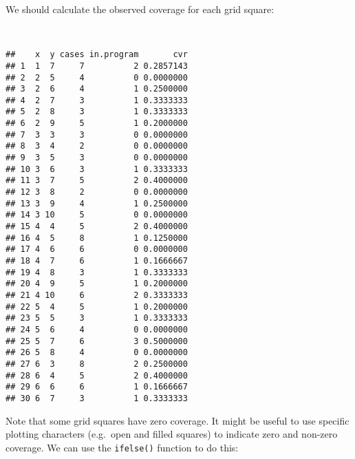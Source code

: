 \documentclass[
  12pt,
  a4paper]{book}
\newenvironment{Shaded}{\begin{snugshade}}{\end{snugshade}}
\newcommand{\DecValTok}[1]{\textcolor[rgb]{0.00,0.00,0.81}{#1}}
\newcommand{\FunctionTok}[1]{\textcolor[rgb]{0.00,0.00,0.00}{#1}}
\newcommand{\NormalTok}[1]{#1}
\newcommand{\OtherTok}[1]{\textcolor[rgb]{0.56,0.35,0.01}{#1}}
\newcommand{\SpecialCharTok}[1]{\textcolor[rgb]{0.00,0.00,0.00}{#1}}
\begin{document}
\newpage

We should calculate the observed coverage for each grid square:

~

\begin{Shaded}
\end{Shaded}

\begin{verbatim}
##    x  y cases in.program       cvr
## 1  1  7     7          2 0.2857143
## 2  2  5     4          0 0.0000000
## 3  2  6     4          1 0.2500000
## 4  2  7     3          1 0.3333333
## 5  2  8     3          1 0.3333333
## 6  2  9     5          1 0.2000000
## 7  3  3     3          0 0.0000000
## 8  3  4     2          0 0.0000000
## 9  3  5     3          0 0.0000000
## 10 3  6     3          1 0.3333333
## 11 3  7     5          2 0.4000000
## 12 3  8     2          0 0.0000000
## 13 3  9     4          1 0.2500000
## 14 3 10     5          0 0.0000000
## 15 4  4     5          2 0.4000000
## 16 4  5     8          1 0.1250000
## 17 4  6     6          0 0.0000000
## 18 4  7     6          1 0.1666667
## 19 4  8     3          1 0.3333333
## 20 4  9     5          1 0.2000000
## 21 4 10     6          2 0.3333333
## 22 5  4     5          1 0.2000000
## 23 5  5     3          1 0.3333333
## 24 5  6     4          0 0.0000000
## 25 5  7     6          3 0.5000000
## 26 5  8     4          0 0.0000000
## 27 6  3     8          2 0.2500000
## 28 6  4     5          2 0.4000000
## 29 6  6     6          1 0.1666667
## 30 6  7     3          1 0.3333333
\end{verbatim}

\newpage

Note that some grid squares have zero coverage. It might be useful to use specific plotting characters (e.g.~open and filled squares) to indicate zero and non-zero coverage. We can use the \texttt{ifelse()} function to do this:

~

\begin{Shaded}
\end{Shaded}
\end{document}
